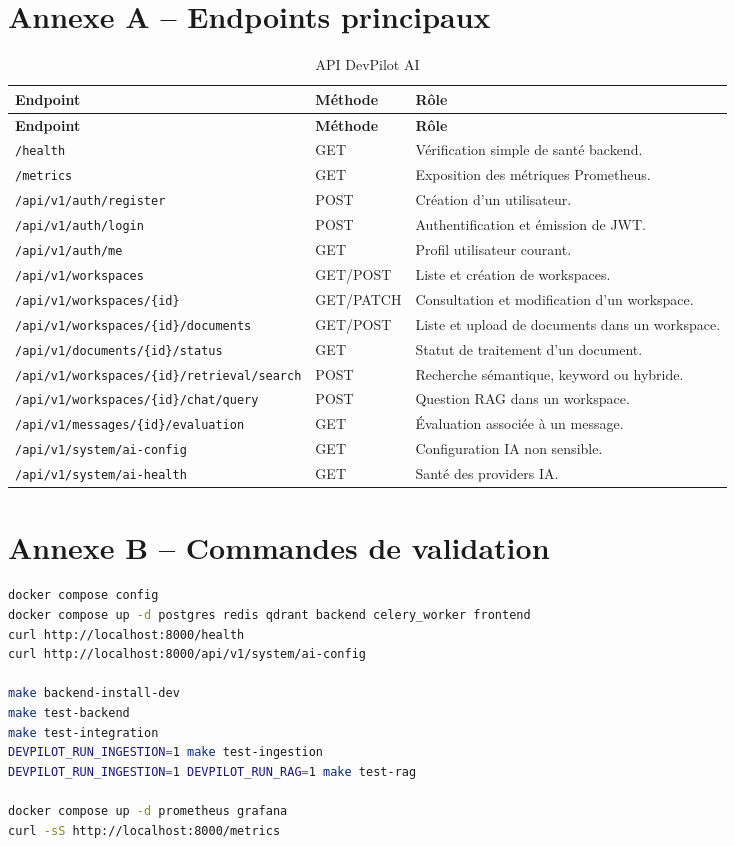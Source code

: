 \documentclass[12pt,a4paper,oneside]{report}
\begin{document}
\chapter{Annexe A -- Endpoints principaux}
\begin{longtable}{L{4.5cm}L{2.4cm}Y}
  \caption{API DevPilot AI}\\
  \toprule
  \textbf{Endpoint} & \textbf{Méthode} & \textbf{Rôle} \\
  \midrule
  \endfirsthead
  \toprule
  \textbf{Endpoint} & \textbf{Méthode} & \textbf{Rôle} \\
  \midrule
  \endhead
  \texttt{/health} & GET & Vérification simple de santé backend. \\
  \texttt{/metrics} & GET & Exposition des métriques Prometheus. \\
  \texttt{/api/v1/auth/register} & POST & Création d'un utilisateur. \\
  \texttt{/api/v1/auth/login} & POST & Authentification et émission de JWT. \\
  \texttt{/api/v1/auth/me} & GET & Profil utilisateur courant. \\
  \texttt{/api/v1/workspaces} & GET/POST & Liste et création de workspaces. \\
  \texttt{/api/v1/workspaces/\{id\}} & GET/PATCH & Consultation et modification d'un workspace. \\
  \texttt{/api/v1/workspaces/\{id\}/documents} & GET/POST & Liste et upload de documents dans un workspace. \\
  \texttt{/api/v1/documents/\{id\}/status} & GET & Statut de traitement d'un document. \\
  \texttt{/api/v1/workspaces/\{id\}/retrieval/search} & POST & Recherche sémantique, keyword ou hybride. \\
  \texttt{/api/v1/workspaces/\{id\}/chat/query} & POST & Question RAG dans un workspace. \\
  \texttt{/api/v1/messages/\{id\}/evaluation} & GET & Évaluation associée à un message. \\
  \texttt{/api/v1/system/ai-config} & GET & Configuration IA non sensible. \\
  \texttt{/api/v1/system/ai-health} & GET & Santé des providers IA. \\
  \bottomrule
\end{longtable}

\chapter{Annexe B -- Commandes de validation}
\begin{lstlisting}[language=bash]
docker compose config
docker compose up -d postgres redis qdrant backend celery_worker frontend
curl http://localhost:8000/health
curl http://localhost:8000/api/v1/system/ai-config

make backend-install-dev
make test-backend
make test-integration
DEVPILOT_RUN_INGESTION=1 make test-ingestion
DEVPILOT_RUN_INGESTION=1 DEVPILOT_RUN_RAG=1 make test-rag

docker compose up -d prometheus grafana
curl -sS http://localhost:8000/metrics
\end{lstlisting}
\end{document}
